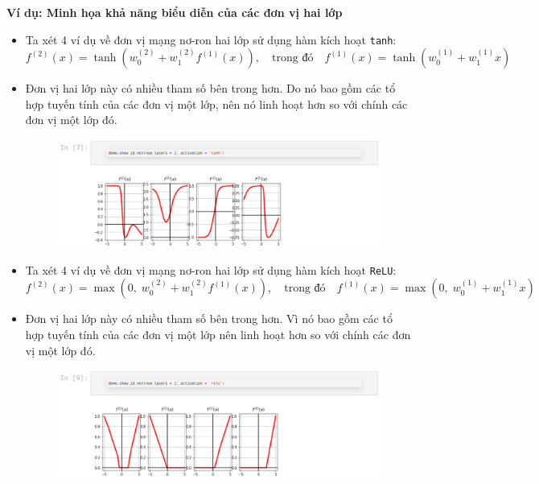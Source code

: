 \documentclass{book}
\begin{document}
    \textbf{Ví dụ: Minh họa khả năng biểu diễn của các đơn vị hai lớp}
    \begin{itemize}
        \item Ta xét 4 ví dụ về đơn vị mạng nơ-ron hai lớp sử dụng hàm kích hoạt \texttt{tanh}:
        \[
        f^{(2)}(x) = \tanh\left(w^{(2)}_0 + w^{(2)}_1 f^{(1)}(x)\right),
        \quad \text{trong đó} \quad
        f^{(1)}(x) = \tanh\left(w^{(1)}_0 + w^{(1)}_1 x\right)
        \]
        \item Đơn vị hai lớp này có nhiều tham số bên trong hơn. Do nó bao gồm các tổ hợp tuyến tính của các đơn vị một lớp, nên nó linh hoạt hơn so với chính các đơn vị một lớp đó.
        \begin{figure}[H]
            \centering
            \includegraphics[width=1.0\linewidth]{images/code21.png}
            \label{fig:code21}
        \end{figure}
    \end{itemize}
    \begin{itemize}
        \item Ta xét 4 ví dụ về đơn vị mạng nơ-ron hai lớp sử dụng hàm kích hoạt \texttt{ReLU}:
        \[
        f^{(2)}(x) = \max\left(0,\; w^{(2)}_0 + w^{(2)}_1 f^{(1)}(x)\right),
        \quad \text{trong đó} \quad
        f^{(1)}(x) = \max\left(0,\; w^{(1)}_0 + w^{(1)}_1 x\right)
        \]
        
        \item Đơn vị hai lớp này có nhiều tham số bên trong hơn. Vì nó bao gồm các tổ hợp tuyến tính của các đơn vị một lớp nên linh hoạt hơn so với chính các đơn vị một lớp đó.
        \begin{figure}[H]
        \centering
        \includegraphics[width=1.0\linewidth]{images/code22.png}
        \label{fig:code22}
    \end{figure}
    \end{itemize}
\end{document}
